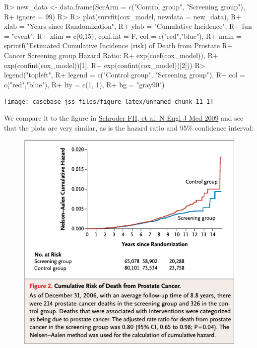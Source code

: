 \documentclass[article]{jss}
\begin{document}
\begin{CodeChunk}

\begin{CodeInput}
R> new_data <- data.frame(ScrArm = c("Control group", "Screening group"),
R+                        ignore = 99)
R> 
R> plot(survfit(cox_model, newdata = new_data),
R+      xlab = "Years since Randomization", 
R+      ylab = "Cumulative Incidence", 
R+      fun = "event",
R+      xlim = c(0,15), conf.int = F, col = c("red","blue"), 
R+      main = sprintf("Estimated Cumulative Incidence (risk) of Death from Prostate 
R+                     Cancer Screening group Hazard Ratio: %
R+                     exp(coef(cox_model)), 
R+                     exp(confint(cox_model))[1], 
R+                     exp(confint(cox_model))[2]))
R> legend("topleft", 
R+        legend = c("Control group", "Screening group"), 
R+        col = c("red","blue"),
R+        lty = c(1, 1), 
R+        bg = "gray90")
\end{CodeInput}


\begin{center}\texttt{[image: casebase\_jss\_files/figure-latex/unnamed-chunk-11-1]} \end{center}

\end{CodeChunk}

We compare it to the figure in
\href{https://github.com/sahirbhatnagar/casebase/blob/master/references/Schroder_et_al-2009-NEJM.pdf}{Schroder
FH, et al. N Engl J Med 2009} and see that the plots are very similar,
as is the hazard ratio and 95\% confidence interval:

\begin{figure}[htbp]
\centering
\includegraphics{figures/schroderNEJM_figure2.png}
\caption{}
\end{figure}
\end{document}
